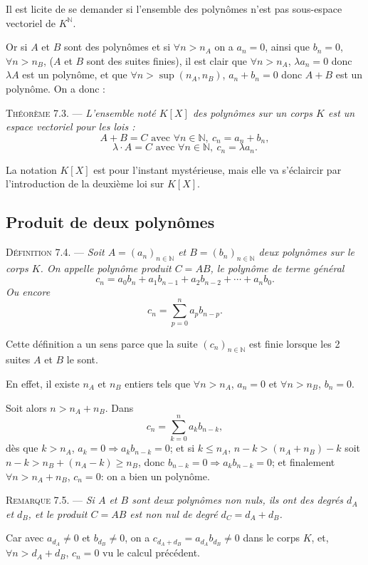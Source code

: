 Il est licite de se demander si l'ensemble des polynômes n'est pas sous-espace vectoriel de $K^{\mathbb N}$.

Or si $A$ et $B$ sont des polynômes et si $\forall n>n_A$ on a $a_n=0$, ainsi que $b_n=0$, $\forall n>n_B$, ($A$ et $B$ sont des suites finies), il est clair que $\forall n>n_A$, $\lambda a_n=0$ donc $\lambda A$ est un polynôme, et que $\forall n>\sup(n_A,n_B)$, $a_n+b_n=0$ donc $A+B$ est un polynôme. On a donc :

\medskip\noindent\textsc{Théorème 7.3.} --- \emph{L'ensemble noté $K[X]$ des polynômes sur un corps $K$ est un espace vectoriel pour les lois :
\[
A+B=C\text{ avec }\forall n\in\mathbb N,\ c_n=a_n+b_n,
\]
\[
\lambda\cdot A=C\text{ avec }\forall n\in\mathbb N,\ c_n=\lambda a_n.
\]} \bookend

La notation $K[X]$ est pour l'instant mystérieuse, mais elle va s'éclaircir par l'introduction de la deuxième loi sur $K[X]$.

\subsection*{Produit de deux polynômes}

\medskip\noindent\textsc{Définition 7.4.} --- \emph{Soit $A=(a_n)_{n\in\mathbb N}$ et $B=(b_n)_{n\in\mathbb N}$ deux polynômes sur le corps $K$. On appelle polynôme produit $C=AB$, le polynôme de terme général
\[
c_n=a_0b_n+a_1b_{n-1}+a_2b_{n-2}+\cdots+a_nb_0.
\]
Ou encore
\[
c_n=\sum_{p=0}^n a_pb_{n-p}.
\]}

Cette définition a un sens parce que la suite $(c_n)_{n\in\mathbb N}$ est finie lorsque les 2 suites $A$ et $B$ le sont.

En effet, il existe $n_A$ et $n_B$ entiers tels que $\forall n>n_A$, $a_n=0$ et $\forall n>n_B$, $b_n=0$.

Soit alors $n>n_A+n_B$. Dans
\[
c_n=\sum_{k=0}^n a_kb_{n-k},
\]
dès que $k>n_A$, $a_k=0\Rightarrow a_kb_{n-k}=0$; et si $k\le n_A$, $n-k>(n_A+n_B)-k$ soit $n-k>n_B+(n_A-k)\ge n_B$, donc $b_{n-k}=0\Rightarrow a_kb_{n-k}=0$; et finalement $\forall n>n_A+n_B$, $c_n=0$: on a bien un polynôme.

\medskip\noindent\textsc{Remarque 7.5.} --- \emph{Si $A$ et $B$ sont deux polynômes non nuls, ils ont des degrés $d_A$ et $d_B$, et le produit $C=AB$ est non nul de degré $d_C=d_A+d_B$.}

Car avec $a_{d_A}\ne0$ et $b_{d_B}\ne0$, on a $c_{d_A+d_B}=a_{d_A}b_{d_B}\ne0$ dans le corps $K$, et, $\forall n>d_A+d_B$, $c_n=0$ vu le calcul précédent. \bookend

